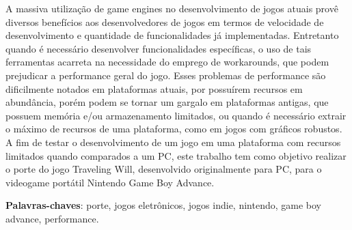 \begin{resumo}

A massiva utilização de game engines no desenvolvimento de jogos atuais provê diversos benefícios aos desenvolvedores de jogos em termos de velocidade de desenvolvimento e quantidade de funcionalidades já implementadas. Entretanto quando é necessário desenvolver funcionalidades específicas, o uso de tais ferramentas acarreta na necessidade do emprego de workarounds, que podem prejudicar a performance geral do jogo. Esses problemas de performance são dificilmente notados em plataformas atuais, por possuírem recursos em abundância, porém podem se tornar um gargalo em plataformas antigas, que possuem memória e/ou armazenamento limitados, ou quando é necessário extrair o máximo de recursos de uma plataforma, como em jogos com gráficos robustos. A fim de testar o desenvolvimento de um jogo em uma plataforma com recursos limitados quando comparados a um PC, este trabalho tem como objetivo realizar o porte do jogo Traveling Will, desenvolvido originalmente para PC, para o videogame portátil Nintendo Game Boy Advance.

 \vspace{\onelineskip}

 \noindent
 \textbf{Palavras-chaves}: porte, jogos eletrônicos, jogos indie, nintendo,  game boy advance, performance.
\end{resumo}
